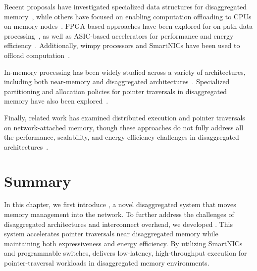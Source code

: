 Recent proposals have investigated specialized data structures for disaggregated memory~\cite{sherman, clover, fusee, rolex, marlin, sephash, ditto}, while others have focused on enabling computation offloading to CPUs on memory nodes~\cite{aifm, kayak_nsdi_21, splinter, storagefunctions, storm_systor_19}. FPGA-based approaches have been explored for on-path data processing~\cite{clio, strom}, as well as ASIC-based accelerators for performance and energy efficiency~\cite{impica, walkers}. Additionally, wimpy processors and SmartNICs have been used to offload computation~\cite{rmc_hotnets20, redn}.

In-memory processing has been widely studied across a variety of architectures, including both near-memory and disaggregated architectures~\cite{ahn2015scalable, impica, asghari2016chameleon, chi2016prime, seshadri2017simple, dai2018graphh, schuiki2018scalable, mutlu2019processing, kwon2019_TensorDIMM, boroumand2019_codna, gu2020ipim, lockerman2020livia, cho2020_data, ke2020_RecNMP, wang2021stream, xie2021spacea, ke2021near, singh2021fpga, olgun2022pidram, mutlu2022modern, oliveira2022accelerating, eckert2022eidetic, tu2022redcim, dai2022dimmining, devic2022_PIM, wang2022_Nearstream, gomez2023evaluating, xie2023mpu}. Specialized partitioning and allocation policies for pointer traversals in disaggregated memory have also been explored~\cite{sherman, clover, fusee, rolex, marlin, sephash, ditto}.

Finally, related work has examined distributed execution and pointer traversals on network-attached memory, though these approaches do not fully address all the performance, scalability, and energy efficiency challenges in disaggregated architectures~\cite{storagefunctions, splinter, aifm, kayak_nsdi_21, walkers, clio, strom, sun2023demystifying}.


\section{Summary}
\label{sec:pulsefuture}

In this chapter, we first introduce \mind, a novel disaggregated system that moves memory management into the network. To further address the challenges of disaggregated architectures and interconnect overhead, we developed \pulse. This system accelerates pointer traversals near disaggregated memory while maintaining both expressiveness and energy efficiency. By utilizing SmartNICs and programmable switches, \pulse delivers low-latency, high-throughput execution for pointer-traversal workloads in disaggregated memory environments.



